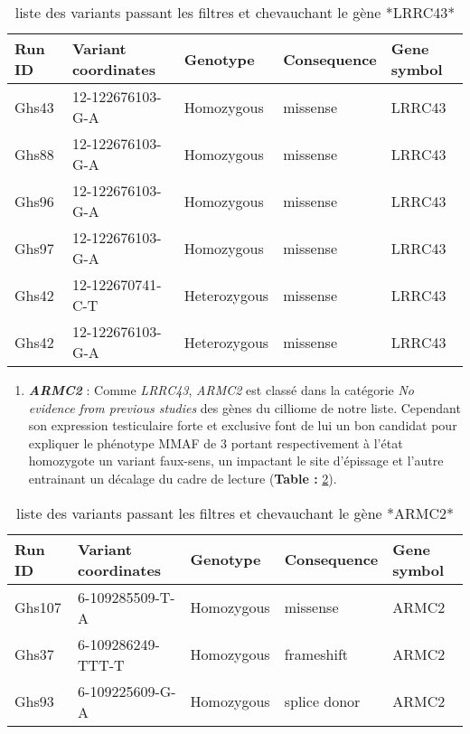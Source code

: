 \documentclass[12pt,twoside]{reedthesis}
\providecommand{\tightlist}{%
  \setlength{\itemsep}{0pt}\setlength{\parskip}{0pt}}
\theoremstyle{definition}
\theoremstyle{definition}
\theoremstyle{remark}
\begin{document}
  \begin{longtable}[t]{lllll}
  \caption{\label{tab:tablrrc43}liste des variants passant les filtres et chevauchant le gène *LRRC43*}\\
  \toprule
  Run ID & Variant coordinates & Genotype & Consequence & Gene symbol\\
  \midrule
  Ghs43 & 12-122676103-G-A & Homozygous & missense & LRRC43\\
  Ghs88 & 12-122676103-G-A & Homozygous & missense & LRRC43\\
  Ghs96 & 12-122676103-G-A & Homozygous & missense & LRRC43\\
  Ghs97 & 12-122676103-G-A & Homozygous & missense & LRRC43\\
  Ghs42 & 12-122670741-C-T & Heterozygous & missense & LRRC43\\
  Ghs42 & 12-122676103-G-A & Heterozygous & missense & LRRC43\\
  \bottomrule
  \end{longtable}
  
  \begin{enumerate}
  \def\labelenumi{\arabic{enumi}.}
  \setcounter{enumi}{3}
  \tightlist
  \item
    \textbf{\emph{ARMC2}} : Comme \emph{LRRC43}, \emph{ARMC2} est classé
    dans la catégorie \emph{No evidence from previous studies} des gènes
    du cilliome de notre liste. Cependant son expression testiculaire
    forte et exclusive font de lui un bon candidat pour expliquer le
    phénotype MMAF de 3 portant respectivement à l'état homozygote un
    variant faux-sens, un impactant le site d'épissage et l'autre
    entrainant un décalage du cadre de lecture (\textbf{Table :
    }\ref{tab:tabarmc2}).
  \end{enumerate}
  
  \begin{longtable}[t]{lllll}
  \caption{\label{tab:tabarmc2}liste des variants passant les filtres et chevauchant le gène *ARMC2*}\\
  \toprule
  Run ID & Variant coordinates & Genotype & Consequence & Gene symbol\\
  \midrule
  Ghs107 & 6-109285509-T-A & Homozygous & missense & ARMC2\\
  Ghs37 & 6-109286249-TTT-T & Homozygous & frameshift & ARMC2\\
  Ghs93 & 6-109225609-G-A & Homozygous & splice donor & ARMC2\\
  \bottomrule
  \end{longtable}
  
\end{document}
